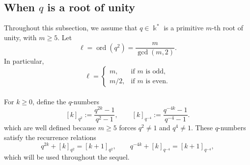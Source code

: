 \documentclass[11pt]{article}
\theoremstyle{definition}
\newcommand{\K}{\Bbbk}
\begin{document}
\subsection[The case where q is a root of unity]{When \(q\) is a root of unity}
Throughout this subsection, we assume that \(q\in\K^*\) is a primitive \(m\)-th root of unity, with \(m\geq5\). Let
$$
\ell=\operatorname{ord}(q^2)
=
\frac{m}{\gcd(m,2)}.
$$
In particular,
$$
\ell=
\begin{cases}
m, & \text{if \(m\) is odd},\\
m/2, & \text{if \(m\) is even}.
\end{cases}
$$
\\
For \(k\geq 0\), define the \(q\)-numbers
\[
[k]_{q^2}:=\frac{q^{2k}-1}{q^2-1},
\qquad
[k]_{q^{-4}}:=\frac{q^{-4k}-1}{q^{-4}-1}.
\]
which are well defined because \(m\geq5\) forces \(q^{2}\neq1\) and
\(q^{4}\neq1\). These \(q\)-numbers satisfy the recurrence relations
\[
q^{2k}+[k]_{q^2}=[k+1]_{q^2},
\qquad
q^{-4k}+[k]_{q^{-4}}=[k+1]_{q^{-4}},
\]
which will be used throughout the sequel.
\end{document}

